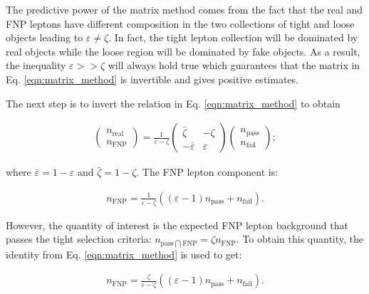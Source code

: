 The predictive power of the matrix method comes from the fact that 
the real and FNP leptons have different composition in the two collections 
of tight and loose objects leading to $\varepsilon \neq \zeta$. In fact, 
the tight lepton collection will be dominated by real objects while the 
loose region will be dominated by fake objects. As a result, 
the inequality $\varepsilon >> \zeta$ will always hold true which 
guarantees that the matrix in Eq. \ref{eqn:matrix_method} is invertible 
and gives positive estimates. 

The next step is to invert the relation in Eq. \ref{eqn:matrix_method} to 
obtain

\begin{align}
\begin{pmatrix}n_\text{real}\\n_\text{FNP}\end{pmatrix} 
= \frac{1}{\varepsilon - \zeta} \begin{pmatrix}\bar\zeta & -\zeta\\ -\bar\varepsilon & \varepsilon\end{pmatrix}
\begin{pmatrix}n_\text{pass}\\n_\text{fail}\end{pmatrix}; 
\label{eqn:fake.inv_matrix_method}
\end{align}

where $\bar\varepsilon = 1 - \varepsilon$ and  $\bar\zeta = 1 - \zeta$. 
The FNP lepton component is: 

\begin{align}
n_\text{FNP} = \frac{1}{\varepsilon - \zeta}\left(\left(\varepsilon-1\right)n_\text{pass}+n_\text{fail}\right).
\label{eqn:fake.nfake}
\end{align}

However, the quantity of interest is the expected FNP lepton background that 
passes the tight selection criteria: 
$n_{\text{pass}~\bigcap~\text{FNP}} = \zeta n_\text{FNP}$.
 To obtain this quantity, 
the identity from Eq. \ref{eqn:matrix_method} is used to get:

\begin{align}
n_\text{FNP} = \frac{\zeta}{\varepsilon - \zeta}\left(\left(\varepsilon-1\right)n_\text{pass}+n_\text{fail}\right).
\label{eqn:fake.nFNPpass}
\end{align}

